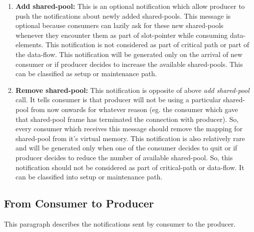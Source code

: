 \documentclass[a4paper,twoside]{report} %
\begin{document}
\begin{enumerate}
  \item \textbf{Add shared-pool:}  This is an optional notification which
  allow producer to push the notifications about newly added
  shared-pools.  This message is optional because consumers
  can lazily ask for these new shared-pools whenever they 
  encounter them as part of slot-pointer while consuming
  data-elements.  This notification is not considered as part of
  critical path or part of the data-flow.  This notification will be
  generated only on the arrival of new consumer or if producer decides
  to increase the available shared-pools.  This can be classified as
  setup or maintenance path.

 \item \textbf{Remove shared-pool:}  This notification is opposite of above
 \textit{add shared-pool} call.  It tells consumer is that producer
 will not be using a particular shared-pool from now onwards
 for whatever reason (eg. the consumer which gave that shared-pool
 frame has terminated the connection with producer).  So, every
 consumer which receives this message should remove the mapping for
 shared-pool from it's virtual memory.  This notification is
 also relatively rare and will be generated only when one of the
 consumer decides to quit or if producer decides to reduce the number
 of available shared-pool.  So, this notification should not
 be considered as part of critical-path or data-flow.  It can be
 classified into setup or maintenance path.
\end{enumerate} 

\subsection{From Consumer to Producer}
This paragraph describes the notifications sent by consumer to the
producer.
\end{document}
